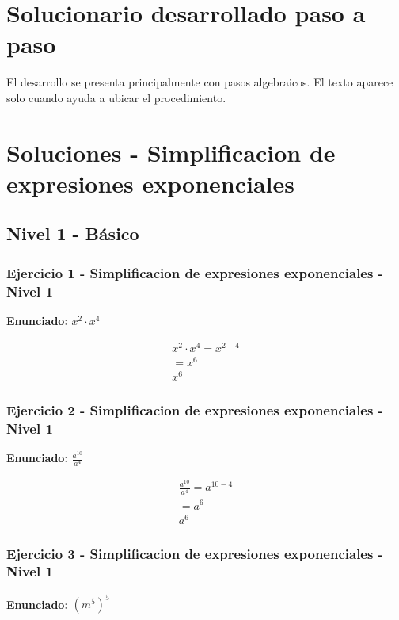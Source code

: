 \documentclass[12pt,a4paper]{article}
\begin{document}
\section*{Solucionario desarrollado paso a paso}

El desarrollo se presenta principalmente con pasos algebraicos. El texto aparece solo cuando ayuda a ubicar el procedimiento.
\newpage

\section*{Soluciones - Simplificacion de expresiones exponenciales}

\subsection*{Nivel 1 - Básico}

\subsubsection*{Ejercicio 1 - Simplificacion de expresiones exponenciales - Nivel 1}
\textbf{Enunciado:} \(x^{2}\cdot x^{4}\)

\[
\begin{aligned}
x^{2}\cdot x^{4}=x^{2+4}\\
=x^{6}\\
\boxed{x^{6}}
\end{aligned}
\]


\subsubsection*{Ejercicio 2 - Simplificacion de expresiones exponenciales - Nivel 1}
\textbf{Enunciado:} \(\frac{a^{10}}{a^{4}}\)

\[
\begin{aligned}
\frac{a^{10}}{a^{4}}=a^{10-4}\\
=a^{6}\\
\boxed{a^{6}}
\end{aligned}
\]


\subsubsection*{Ejercicio 3 - Simplificacion de expresiones exponenciales - Nivel 1}
\textbf{Enunciado:} \(\left(m^{5}\right)^{5}\)
\end{document}
